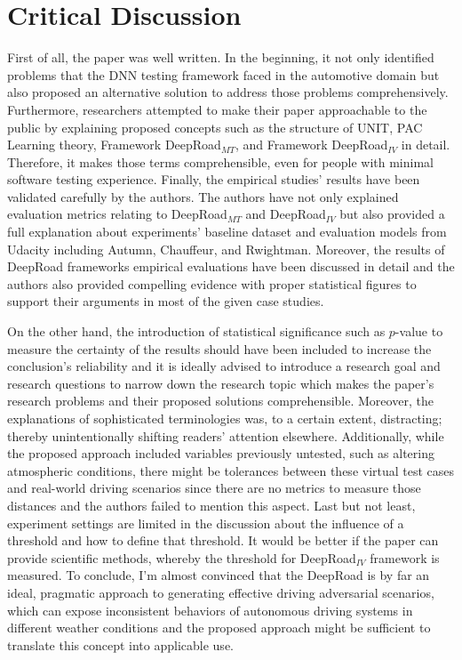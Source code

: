 \documentclass[10pt,a4paper]{report}
\begin{document}
\section{Critical Discussion}
First of all, the paper was well written. In the beginning, it not only identified problems that the DNN testing framework faced in the automotive domain but also proposed an alternative solution to address those problems comprehensively.
%
Furthermore, researchers attempted to make their paper approachable to the public by explaining proposed concepts such as the structure of UNIT, PAC Learning theory, Framework DeepRoad$_{MT}$, and Framework DeepRoad$_{IV}$ in detail. 
%
Therefore, it makes those terms comprehensible, even for people with minimal software testing experience.
%
Finally, the empirical studies' results have been validated carefully by the authors.
%
The authors have not only explained evaluation metrics relating to DeepRoad$_{MT}$ and DeepRoad$_{IV}$ but also provided a full explanation about experiments' baseline dataset and evaluation models from Udacity including Autumn, Chauffeur, and Rwightman.
%
Moreover, the results of DeepRoad frameworks empirical evaluations have been discussed in detail and the authors also provided compelling evidence with proper statistical figures to support their arguments in most of the given case studies.
%

On the other hand, the introduction of statistical significance such as $p$-value to measure the certainty of the results should have been included to increase the conclusion's reliability and it is ideally advised to introduce a research goal and research questions to narrow down the research topic which makes the paper's research problems and their proposed solutions comprehensible.
%
Moreover, the explanations of sophisticated terminologies was, to a certain extent, distracting; thereby unintentionally shifting readers' attention elsewhere.
%
Additionally, while the proposed approach included variables previously untested, such as altering atmospheric conditions, there might be tolerances between these virtual test cases and real-world driving scenarios since there are no metrics to measure those distances and the authors failed to mention this aspect.
%
Last but not least, experiment settings are limited in the discussion about the influence of a threshold and how to define that threshold.
%
It would be better if the paper can provide scientific methods, whereby the threshold for DeepRoad$_{IV}$ framework is measured.
%
To conclude, I’m almost convinced that the DeepRoad is by far an ideal, pragmatic approach to generating effective driving adversarial scenarios, which can expose inconsistent behaviors of autonomous driving systems in different weather conditions and the proposed approach might be sufficient to translate this concept into applicable use.
\end{document}
